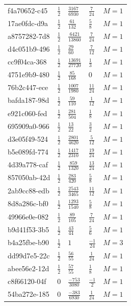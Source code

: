 \documentclass[11pt,twoside,openright]{book}
\begin{document}
\begin{longtable}{p{4.5cm}llll}
f4a70652-c45 & $\frac{1}{2}$ & $\frac{3167}{6930}$ & $\frac{7}{24}$ & $M=1$ \\
17ae0fdc-d9a & $\frac{1}{2}$ & $\frac{61}{132}$ & $\frac{5}{8}$ & $M=1$ \\
a8757282-7d8 & $\frac{1}{2}$ & $\frac{6421}{13860}$ & $\frac{7}{24}$ & $M=1$ \\
d4c051b9-496 & $\frac{1}{2}$ & $\frac{29}{60}$ & $\frac{7}{12}$ & $M=1$ \\
cc9f04ca-368 & $\frac{1}{2}$ & $\frac{13691}{27720}$ & $\frac{1}{3}$ & $M=1$ \\
4751e9b9-480 & $\frac{1}{2}$ & $\frac{85}{168}$ & $0$ & $M=1$ \\
76b2c447-ece & $\frac{1}{2}$ & $\frac{1007}{1980}$ & $\frac{11}{24}$ & $M=1$ \\
bafda187-98d & $\frac{1}{2}$ & $\frac{59}{110}$ & $\frac{1}{12}$ & $M=1$ \\
e921c060-fed & $\frac{1}{2}$ & $\frac{281}{504}$ & $\frac{1}{8}$ & $M=1$ \\
695909a0-966 & $\frac{1}{2}$ & $\frac{13}{22}$ & $\frac{3}{2}$ & $M=1$ \\
d3e05f49-524 & $\frac{1}{2}$ & $\frac{2801}{4620}$ & $\frac{5}{12}$ & $M=1$ \\
b5e089fd-774 & $\frac{1}{2}$ & $\frac{1417}{2310}$ & $\frac{19}{24}$ & $M=1$ \\
4d39a778-caf & $\frac{1}{2}$ & $\frac{859}{1320}$ & $\frac{13}{24}$ & $M=1$ \\
857050ab-42d & $\frac{1}{2}$ & $\frac{283}{420}$ & $\frac{5}{8}$ & $M=1$ \\
2ab9cc88-edb & $\frac{1}{2}$ & $\frac{2543}{3465}$ & $\frac{11}{12}$ & $M=1$ \\
8d8a286c-bf0 & $\frac{1}{2}$ & $\frac{1293}{1540}$ & $\frac{5}{8}$ & $M=1$ \\
49966e0e-082 & $\frac{1}{2}$ & $\frac{89}{105}$ & $\frac{7}{24}$ & $M=1$ \\
b9d41f53-3b5 & $\frac{1}{2}$ & $\frac{43}{44}$ & $\frac{5}{6}$ & $M=1$ \\
b4a25fbe-b90 & $\frac{1}{2}$ & $1$ & $\frac{-1}{24}$ & $M=3$ \\
dd99d7e5-22c & $\frac{1}{2}$ & $\frac{56}{55}$ & $\frac{1}{24}$ & $M=1$ \\
abee56e2-12d & $\frac{1}{2}$ & $\frac{57}{55}$ & $\frac{1}{8}$ & $M=1$ \\
c8f66120-04f & $0$ & $\frac{-753}{3080}$ & $\frac{-1}{2}$ & $M=1$ \\
54ba272e-185 & $0$ & $\frac{-383}{6930}$ & $\frac{1}{24}$ & $M=1$ \\

\end{longtable}
\end{document}
